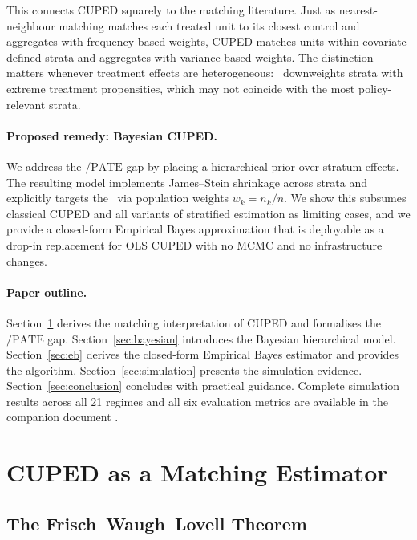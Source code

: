 \documentclass[12pt]{article}
\theoremstyle{plain}
\theoremstyle{definition}
\newcommand{\PATE}{\text{PATE}}
\newcommand{\VWATT}{\text{VWATT}}
\begin{document}
This connects CUPED squarely to the matching literature.
Just as nearest-neighbour matching matches each treated unit to its closest
control and aggregates with frequency-based weights, CUPED matches units
within covariate-defined strata and aggregates with variance-based weights.
The distinction matters whenever treatment effects are heterogeneous:
\VWATT\ downweights strata with extreme treatment propensities, which may
not coincide with the most policy-relevant strata.

\paragraph{Proposed remedy: Bayesian CUPED.}
We address the \VWATT$/\PATE$ gap by placing a hierarchical prior over
stratum effects.
The resulting model implements James--Stein shrinkage across strata and
explicitly targets the \PATE\ via population weights $w_k = n_k/n$.
We show this subsumes classical CUPED and all variants of stratified
estimation as limiting cases, and we provide a closed-form Empirical Bayes
approximation that is deployable as a drop-in replacement for OLS CUPED with
no MCMC and no infrastructure changes.

\paragraph{Paper outline.}
Section~\ref{sec:cuped_matching} derives the matching interpretation of
CUPED and formalises the \VWATT$/\PATE$ gap.
Section~\ref{sec:bayesian} introduces the Bayesian hierarchical model.
Section~\ref{sec:eb} derives the closed-form Empirical Bayes estimator and
provides the algorithm.
Section~\ref{sec:simulation} presents the simulation evidence.
Section~\ref{sec:conclusion} concludes with practical guidance.
Complete simulation results across all 21 regimes and all six evaluation
metrics are available in the companion document \citep{farahat2026sim}.

\section{CUPED as a Matching Estimator}
\label{sec:cuped_matching}

\subsection{The Frisch--Waugh--Lovell Theorem}
\end{document}
